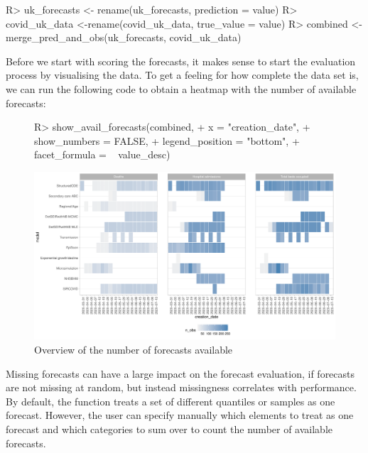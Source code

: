 \documentclass[article]{jss}
\begin{document}
% 
\begin{Schunk}
\begin{Sinput}
R> uk_forecasts <- rename(uk_forecasts, prediction = value)
R> covid_uk_data <-rename(covid_uk_data, true_value = value)
R> combined <- merge_pred_and_obs(uk_forecasts, covid_uk_data)
\end{Sinput}
\end{Schunk}
% 
Before we start with scoring the forecasts, it makes sense to start the evaluation process by visualising the data. To get a feeling for how complete the data set is, we can run the following code to obtain a heatmap with the number of available forecasts: 
% 
\begin{figure}[h]
\centering
\begin{Schunk}
\begin{Sinput}
R> show_avail_forecasts(combined, 
+                       x = "creation_date", 
+                       show_numbers = FALSE,
+                       legend_position = "bottom",
+                       facet_formula = ~ value_desc)
\end{Sinput}
\end{Schunk}
\includegraphics{plots/plot-show-availability}
\caption{\label{fig:avail-forecasts} Overview of the number of forecasts available}
\end{figure}
% 
Missing forecasts can have a large impact on the forecast evaluation, if forecasts are not missing at random, but instead missingness correlates with performance. By default, the function treats a set of different quantiles or samples as one forecast. However, the user can specify manually which elements to treat as one forecast and which categories to sum over to count the number of available forecasts. 
\end{document}
